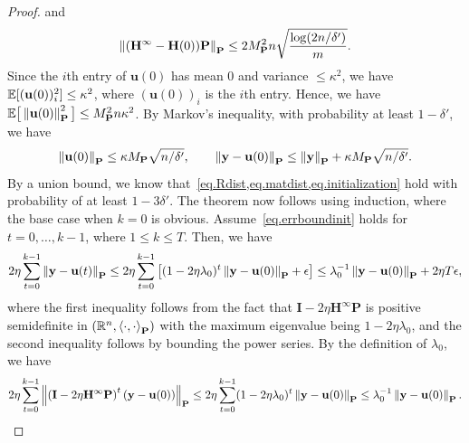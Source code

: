 \begin{proof}
and 
\begin{equation} 
    \left\lVert(\mathbf{H}^\infty - \mathbf{H}(0))\mathbf{P}\right\rVert_{\mathbf{P}} \leq 2M_{\mathbf{P}}^2n \sqrt{\frac{\log(2n/\delta')}{m}}.
    \label{eq.matdist}
\end{equation} 
Since the $i$th entry of $\mathbf{u}(0)$ has mean $0$ and variance $\leq \kappa^2$, we have $\mathbb{E}[(\mathbf{u}(0))_i^2] \leq \kappa^2$, where $(\mathbf{u}(0))_i$ is the $i$th entry. %
Hence, we have $\mathbb{E}\big[\left\lVert\mathbf{u}(0)\right\rVert_{\mathbf{P}}^2\big] \leq M_{\mathbf{P}}^2n\kappa^2$. By Markov's inequality, with probability at least $1 - \delta'$, we have
\begin{equation}\label{eq.initialization}
    \left\lVert\mathbf{u}(0)\right\rVert_{\mathbf{P}} \leq \kappa M_{\mathbf{P}}\sqrt{n/\delta'}, \qquad \left\lVert\mathbf{y} - \mathbf{u}(0)\right\rVert_{\mathbf{P}} \leq \left\lVert\mathbf{y}\right\rVert_{\mathbf{P}} + \kappa M_{\mathbf{P}}\sqrt{n/\delta'}.
\end{equation}
By a union bound, we know that~\cref{eq.Rdist,eq.matdist,eq.initialization} hold with probability of at least $1-3\delta'$. The theorem now follows using induction, where the base case when $k = 0$ is obvious. Assume~\cref{eq.errboundinit} holds for $t = 0, \ldots, k-1$, where $1\leq k \leq T$. Then, we have
\begin{equation}\label{eq.sumvec}
    2\eta\sum_{t=0}^{k-1} \left\lVert\mathbf{y} - \mathbf{u}(t)\right\rVert_{\mathbf{P}} \leq 2\eta \sum_{t=0}^{k-1} \left[(1-2\eta\lambda_0)^t\left\lVert\mathbf{y} - \mathbf{u}(0)\right\rVert_{\mathbf{P}} + \epsilon\right] \leq \lambda_0^{-1}\left\lVert\mathbf{y} - \mathbf{u}(0)\right\rVert_{\mathbf{P}} + 2\eta T\epsilon,
\end{equation}
where the first inequality follows from the fact that $\mathbf{I} - 2\eta \mathbf{H}^\infty\mathbf{P}$ is positive semidefinite in $(\mathbb{R}^n,\left\langle \cdot, \cdot \right\rangle_\mathbf{P})$ with the maximum eigenvalue being $1 - 2\eta\lambda_0$, and the second inequality follows by bounding the power series. By the definition of $\lambda_0$, we have
\begin{equation}\label{eq.summatinit}
    2\eta \sum_{t=0}^{k-1} \left\lVert\left(\mathbf{I} - 2\eta \mathbf{H}^\infty\mathbf{P}\right)^t (\mathbf{y} - \mathbf{u}(0))\right\rVert_{\mathbf{P}} \leq 2\eta \sum_{t=0}^{k-1} (1-2\eta\lambda_0)^t \left\lVert\mathbf{y} - \mathbf{u}(0)\right\rVert_{\mathbf{P}} \leq \lambda_0^{-1} \left\lVert\mathbf{y} - \mathbf{u}(0)\right\rVert_{\mathbf{P}}.
\end{equation}

\end{proof}
